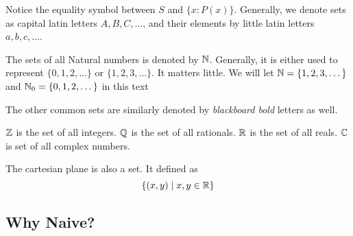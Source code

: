 \begin{remark}
    Notice the equality symbol between \(S\) and \( \{x : P(x)\} \). Generally, we denote sets
    as capital latin letters \(A, B, C, \dots\), and their elements by little latin
    letters \(a, b, c, \dots\).
\end{remark}

\begin{example}
    The sets of all Natural numbers is denoted by \(\mathbb N\). Generally, it is either used to 
    represent \( \{0, 1, 2, \dots\} \) or \( \{1, 2, 3, \dots\} \). It matters little.
    We will let \(\mathbb N = \{1, 2, 3, \dots\}\) and \(\mathbb N_0 = \{0, 1, 2, \dots\}\) in this text 
\end{example}

\begin{example}
    The other common sets are similarly denoted by \emph{blackboard bold} letters as well.
    \begin{enumerate}
        \ii \(\mathbb Z\) is the set of all integers.
        \ii \(\mathbb Q\) is the set of all rationals.
        \ii \(\mathbb R\) is the set of all reals.
        \ii \(\mathbb C\) is set of all complex numbers.
    \end{enumerate}
\end{example}


\begin{example}
    The cartesian plane is also a set. It defined as \[\{(x,y) \mid x, y \in \mathbb R\}\]
\end{example}

\subsection{Why Naive?}



